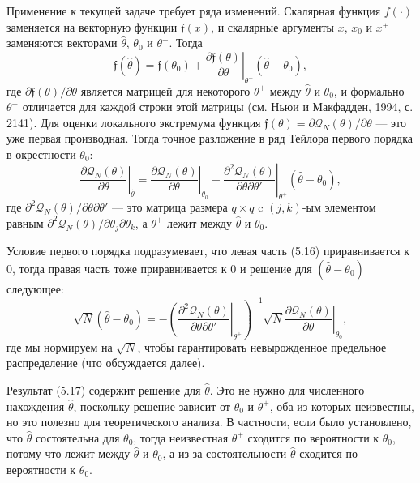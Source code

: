 Применение к текущей задаче требует ряда изменений. Скалярная функция $f(\cdot)$ заменяется на векторную функции $\mathfrak{f}(x)$, и скалярные аргументы $x$, $x_0$ и $x^+$ заменяются векторами $\hat{\theta}$, $\theta_0$ и $\theta^+$. Тогда 
\begin{equation}
\left. \mathfrak{f}(\hat{\theta})=\mathfrak{f}(\theta_0)+\frac{\partial \mathfrak{f}(\theta)}{\partial \theta} \right|_{\theta^+} (\hat{\theta}-\theta_0),
\end{equation}
где $ \partial \mathfrak{f}(\theta)/ \partial \theta$ является матрицей для некоторого $\theta^+$ между $\hat{\theta}$ и $\theta_0$, и формально $\theta^+$ отличается для каждой строки этой матрицы (см. Ньюи и Макфадден, 1994, с. 2141). Для оценки локального экстремума функция $\mathfrak{f}(\theta)= \partial \mathcal{Q}_N(\theta) / \partial \theta$ --- это уже первая производная. Тогда точное разложение в ряд Тейлора первого порядка в окрестности $\theta_0$:
\begin{equation}
\left. \frac{\partial \mathcal{Q}_N(\theta)}{\partial \theta} \right|_{\hat{\theta}} = \left. \frac{\partial \mathcal{Q}_N(\theta)}{\partial \theta} \right|_{\theta_0} + \left. \frac{\partial^2 \mathcal{Q}_N(\theta)}{\partial \theta \partial \theta'} \right|_{\theta^+} (\hat{\theta}-\theta_0),
\end{equation}
где $\partial^2 \mathcal{Q}_N(\theta) / \partial \theta \partial \theta'$ --- это матрица размера $q \times q$ c $(j,k)$-ым элементом равным $\partial^2 \mathcal{Q}_N(\theta) / \partial \theta_j \partial \theta_k$, а $\theta^+$ лежит между $\hat{\theta}$ и $\theta_0$.

Условие первого порядка подразумевает, что левая часть (5.16) приравнивается к 0, тогда правая часть тоже приравнивается к 0 и решение для $(\hat{\theta}-\theta_0)$ следующее:
\begin{equation}
\left. \sqrt{N}(\hat{\theta} - \theta_0)=- \left( \frac{\partial^2 \mathcal{Q}_N(\theta)}{\partial \theta \partial \theta'} \right|_{\theta^+} \right) ^{-1} \sqrt{N} \left. \frac{\partial \mathcal{Q}_N(\theta)} {\partial \theta} \right|_{\theta_0},
\end{equation}
где мы нормируем на $\sqrt{N}$, чтобы гарантировать невырожденное предельное распределение (что обсуждается далее).

Результат (5.17) содержит решение для $\hat{\theta}$. Это не нужно для численного нахождения $\hat{\theta}$, поскольку решение зависит от $\theta_0$ и $\theta^+$, оба из которых неизвестны, но это полезно для теоретического анализа. В частности, если было установлено, что $\hat{\theta}$ состоятельна для $\theta_0$, тогда неизвестная $\theta^+$ сходится по вероятности к $\theta_0$, потому что лежит между $\hat{\theta}$ и $\theta_0$, а из-за состоятельности $\hat{\theta}$ сходится по вероятности к $\theta_0$. 

